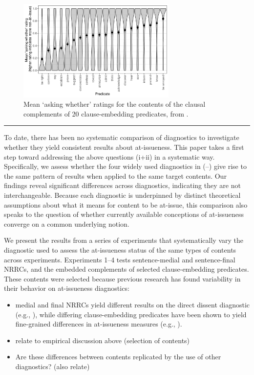 \documentclass[times,linguex,xcolor]{glossa}
\begin{document}
  
  \begin{figure}[h!]
    \centering

    \includegraphics[width=0.7\textwidth]{../../results/degen-tonhauser-glossa/graphs/mean-asking-whether-ratings.pdf}

    \caption{Mean `asking whether' ratings for the contents of the clausal complements of 20 clause-embedding predicates, from \citealt{degen-tonhauser-glossa}.}
    \label{fig:dtglossa}
  \end{figure}
  
  \bigskip \hrule\bigskip


To date, there has been no systematic comparison of diagnostics to investigate whether they yield consistent results about at-issueness.
  This paper takes a first step toward addressing the above questions (i+ii) in a systematic way. Specifically, we assess whether the four widely used diagnostics in (--) give rise to the same pattern of results when applied to the same target contents. Our findings reveal significant differences across diagnostics, indicating they are not interchangeable. Because each diagnostic is underpinned by distinct theoretical assumptions about what it means for content to be at-issue, this comparison also speaks to the question of whether currently available conceptions of at-issueness converge on a common underlying notion.

  We present the results from a series of experiments that systematically vary the diagnostic used to assess the at-issueness status of the same types of contents across experiments. Experiments 1--4 tests sentence-medial and sentence-final NRRCs, and the embedded complements of selected clause-embedding predicates. These contents were selected because previous research has found variability in their behavior on at-issueness diagnostics:
  \begin{itemize}
    \item medial and final NRRCs yield different results on the direct dissent diagnostic (e.g., \citealt{syrett_experimental_2015}), while differing clause-embedding predicates have been shown to yield fine-grained differences in at-issueness measures (e.g., \citealt{tonhauser_how_2018,degen-tonhauser-glossa}).
    \item relate to empirical discussion above (selection of contents)
    \item Are these differences between contents replicated by the use of other diagnostics? (also relate)
  \end{itemize}
\end{document}
